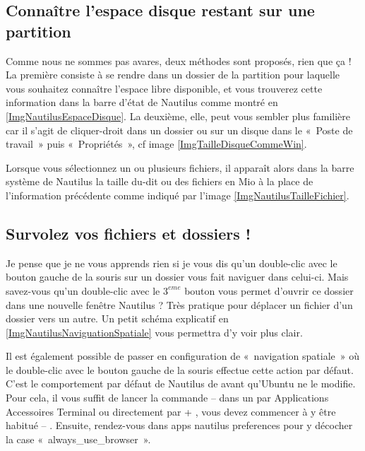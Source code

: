 \subsection{Connaître l'espace disque restant sur une partition}
\NautilusTaille
{}
Comme nous ne sommes pas avares, deux méthodes sont proposés, rien que ça ! La première consiste à se rendre dans un dossier de la partition pour laquelle vous souhaitez connaître l'espace libre disponible, et vous trouverez cette information dans la barre d'état de Nautilus comme montré en \ref{ImgNautilusEspaceDisque}. La deuxième, elle, peut vous sembler plus familière car il s'agit de cliquer-droit dans un dossier ou sur un disque dans le «~Poste de travail~» puis «~Propriétés~», cf image \ref{ImgTailleDisqueCommeWin}.
\begin{nota}
\label{RefTailleDossier}
Lorsque vous sélectionnez un ou plusieurs fichiers, il apparaît alors dans la barre système de Nautilus la taille du-dit ou des fichiers en Mio à la place de l'information précédente comme indiqué par l'image \ref{ImgNautilusTailleFichier}.
\end{nota}
\subsection{Survolez vos fichiers et dossiers !}
Je pense que je ne vous apprends rien si je vous dis qu'un double-clic avec le bouton gauche de la souris sur un dossier vous fait naviguer dans celui-ci. Mais savez-vous qu'un double-clic avec le $3^{eme}$ bouton vous permet d'ouvrir ce dossier dans une nouvelle fenêtre Nautilus ? Très pratique pour déplacer un fichier d'un dossier vers un autre. Un petit schéma explicatif en \ref{ImgNautilusNaviguationSpatiale} vous permettra d'y voir plus clair.\par
{}
\begin{nota}
Il est également possible de passer en configuration de «~navigation spatiale~» où le double-clic avec le bouton gauche de la souris effectue cette action par défaut. C'est le comportement par défaut de Nautilus de  avant qu'Ubuntu ne le modifie.\\
Pour cela, il vous suffit de lancer la commande -- dans un  par Applications \FlecheDroite Accessoires \FlecheDroite Terminal ou directement par  + , vous devez commencer à y être habitué -- . Ensuite, rendez-vous dans apps \FlecheDroite nautilus \FlecheDroite preferences pour y décocher la case «~always\_use\_browser~».
\end{nota}
